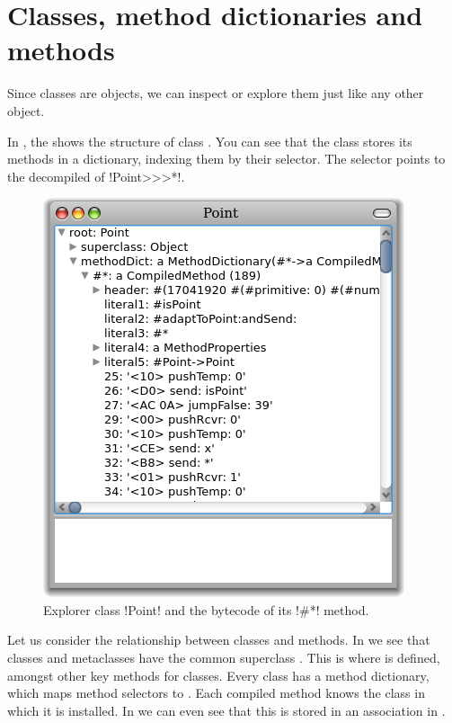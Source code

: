 \documentclass[a4paper,10pt,twoside]{book}
\begin{document}
\section{Classes, method dictionaries and methods}

Since classes are objects, we can inspect or explore them just like any other object.


In , the  shows the structure of class .
You can see that the class stores its methods in a dictionary, indexing them by their selector.
The selector \ct{#*} points to the decompiled  of \ct!Point>>>*!.

\begin{figure}[ht]\centering
	\includegraphics[width=.5\linewidth]{CompiledMethod}
	\caption{Explorer class \ct!Point! and the bytecode of its \ct!\#*! method.}
\end{figure}

Let us consider the relationship between classes and methods.
In  we see that classes and metaclasses have the common superclass . This is where  is defined, amongst other key methods for classes.
Every class has a method dictionary, which maps method selectors to .
Each compiled method knows the class in which it is installed.
In  we can even see that this is stored in an association in .
\end{document}

